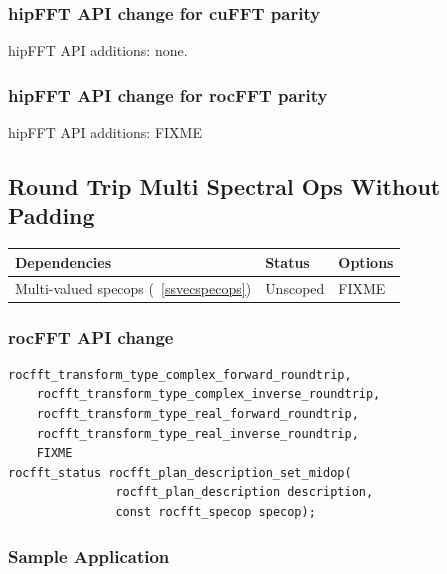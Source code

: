 \documentclass[12pt]{article}
\renewcommand{\(}{\left(}
\renewcommand{\)}{\right)}
\begin{document}
\subsubsection{hipFFT API change for cuFFT parity}

hipFFT API additions: none.

\subsubsection{hipFFT API change for rocFFT parity}
\noindent
hipFFT API additions: FIXME

\newpage
\subsection{Round Trip Multi Spectral Ops Without Padding}
\label{ssroundspecops}


\begin{center}
  \begin{tabular}{|l|l|p{5cm}|}
    \hline
    Dependencies & Status & Options \\
    \hline
    Multi-valued specops (~\ref{ssvecspecops}) & Unscoped   & FIXME \\
    \hline
  \end{tabular}
\end{center}
\noindent


\subsubsection{rocFFT API change}
\begin{lstlisting}
rocfft_transform_type_complex_forward_roundtrip,
    rocfft_transform_type_complex_inverse_roundtrip,
    rocfft_transform_type_real_forward_roundtrip,
    rocfft_transform_type_real_inverse_roundtrip,
    FIXME
rocfft_status rocfft_plan_description_set_midop(
               rocfft_plan_description description,
               const rocfft_specop specop);
\end{lstlisting}


\subsubsection{Sample Application}
\end{document}
